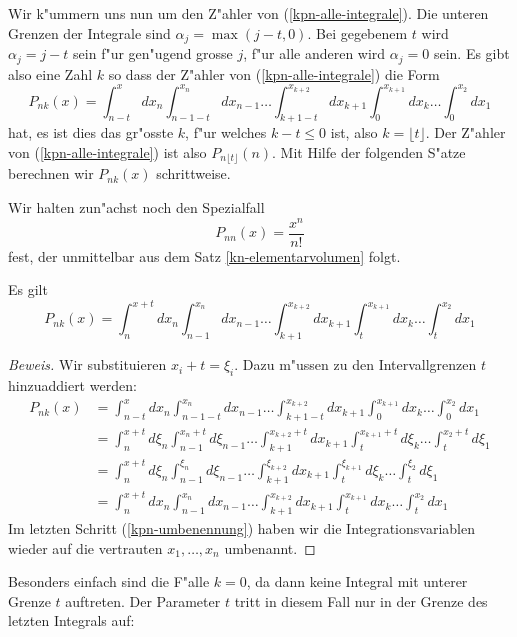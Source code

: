 Wir k"ummern uns nun um den Z"ahler von (\ref{kpn-alle-integrale}).
Die unteren Grenzen der Integrale sind $\alpha_j=\max(j-t,0)$.
Bei gegebenem $t$ wird $\alpha_j=j-t$
sein f"ur gen"ugend grosse $j$, f"ur alle anderen wird $\alpha_j=0$ sein.
Es gibt also eine Zahl $k$ so dass der Z"ahler von (\ref{kpn-alle-integrale})
die Form
\[
P_{nk}(x)
=
\int_{n-t}^xdx_n\int_{n-1-t}^{x_n}dx_{n-1}\dots\int_{k+1-t}^{x_{k+2}}dx_{k+1}\int_0^{x_{k+1}}dx_k\dots\int_0^{x_2}dx_1
\]
hat, es ist dies das gr"osste $k$, f"ur welches $k-t\le 0$ ist, also
$k=\lfloor t\rfloor$.
Der Z"ahler von (\ref{kpn-alle-integrale})
ist also $P_{n\lfloor t\rfloor}(n)$.
Mit Hilfe der folgenden S"atze berechnen wir $P_{nk}(x)$ schrittweise.

Wir halten zun"achst noch den Spezialfall
\begin{equation}
P_{nn}(x)=\frac{x^n}{n!}
\label{spezialfall-pnn}
\end{equation}
fest, der unmittelbar aus dem Satz \ref{kn-elementarvolumen} folgt.

\begin{satz}
\label{kn-variablentransformation}
Es gilt
\begin{equation}
P_{nk}(x)=\int_{n}^{x+t}dx_n\int_{n-1}^{x_n}dx_{n-1}\dots\int_{k+1}^{x_{k+2}}dx_{k+1}\int_t^{x_{k+1}}dx_k\dots\int_t^{x_2}dx_1
\label{kpn-variablen-transformation}
\end{equation}
\end{satz}
\begin{proof}[Beweis]
Wir substituieren $x_i+t=\xi_i$.
Dazu m"ussen zu den Intervallgrenzen
$t$ hinzuaddiert werden:
\begin{align}
P_{nk}(x)
&=
\int_{n-t}^xdx_n\int_{n-1-t}^{x_n}dx_{n-1}\dots\int_{k+1-t}^{x_{k+2}}dx_{k+1}\int_0^{x_{k+1}}dx_k\dots\int_0^{x_2}dx_1
\nonumber\\
&=
\int_{n}^{x+t}d\xi_n\int_{n-1}^{x_n+t}d\xi_{n-1}\dots\int_{k+1}^{x_{k+2}+t}dx_{k+1}\int_t^{x_{k+1}+t}d\xi_k\dots\int_t^{x_2+t}d\xi_1
\nonumber\\
&=
\int_{n}^{x+t}d\xi_n\int_{n-1}^{\xi_n}d\xi_{n-1}\dots\int_{k+1}^{\xi_{k+2}}dx_{k+1}\int_t^{\xi_{k+1}}d\xi_k\dots\int_t^{\xi_2}d\xi_1
\nonumber\\
&=
\int_{n}^{x+t}dx_n\int_{n-1}^{x_n}dx_{n-1}\dots\int_{k+1}^{x_{k+2}}dx_{k+1}\int_t^{x_{k+1}}dx_k\dots\int_t^{x_2}dx_1
\label{kpn-umbenennung}
\end{align}
Im letzten Schritt (\ref{kpn-umbenennung}) haben wir die Integrationsvariablen
wieder auf die vertrauten $x_1,\dots,x_n$ umbenannt.
\end{proof}
Besonders einfach sind die F"alle $k=0$, da dann keine Integral mit
unterer Grenze $t$ auftreten.
Der Parameter $t$ tritt in diesem Fall nur
in der Grenze des letzten Integrals auf:

